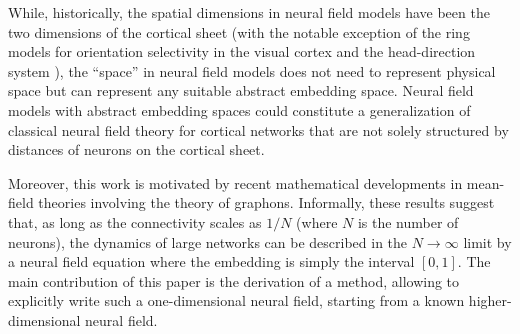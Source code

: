 \documentclass[10pt,letterpaper]{article}
\begin{document}
While, historically, the spatial dimensions in neural field models have been the two dimensions of the cortical sheet (with the notable exception of the ring models for orientation selectivity in the visual cortex \cite{BenBar95} and the head-direction system \cite{Zha96}), the ``space'' in neural field models does not need to represent physical space but can represent any suitable abstract embedding space. Neural field models with abstract embedding spaces could constitute a generalization of classical neural field theory for cortical networks that are not solely structured by distances of neurons on the cortical sheet.

Moreover, this work is motivated by recent mathematical developments \cite{JabPoy21} in mean-field theories involving the theory of graphons. Informally, these results suggest that, as long as the connectivity scales as $1/N$ (where $N$ is the number of neurons), the dynamics of large networks can be described in the $N \to \infty$ limit by a neural field equation where the embedding is simply the interval $[0,1]$. The main contribution of this paper is the derivation of a method, allowing to explicitly write such a one-dimensional neural field, starting from a known higher-dimensional neural field.




\end{document}
